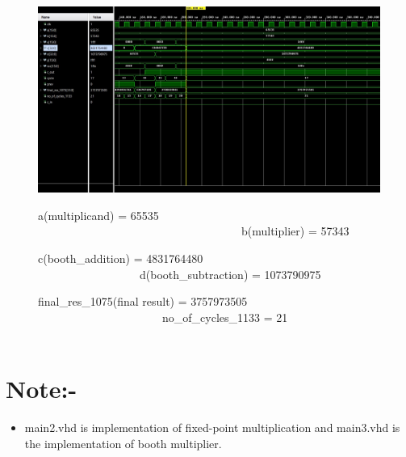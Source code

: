 \documentclass[11pt]{article}
\begin{document}
\begin{figure}[H]
  \centering
  \includegraphics[width=1\textwidth]{img2.jpg}
  \captionsetup{labelformat=empty}
  \caption{a(multiplicand) = 65535 \ \ \ \ \ \ \ \ \ \ \ \ \ \ \  \ \ \ \ \ \ \ \ \ \ \ \ \ \ \ \ \ \ \ \ \ b(multiplier) = 57343 }
\caption{c(booth\_addition) = 4831764480 \ \ \ \ \ \ \ \ \ \ \ \ \ \ \ \ \ \ d(booth\_subtraction) = 1073790975 }
  \caption{final\_res\_1075(final result) = 3757973505 \ \ \ \ \ \ \ \ \ \ \ \ \ \ \ \ \ \ \ \ \ \ no\_of\_cycles\_1133 = 21 \ \ \ \ \ \ \ \ \ \ \ \ \ \ \ \ } 
\end{figure}

\section{Note:-}
\begin{itemize}
    \item 
main2.vhd is implementation of fixed-point multiplication and main3.vhd is the implementation of booth multiplier.
\end{itemize}
\end{document}
